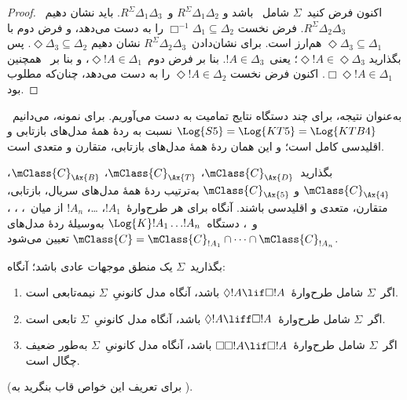 \documentclass[../../../include/open-logic-section]{subfiles}
\begin{document}
\begin{proof}
  اکنون فرض کنید~$\Sigma$ شامل~ باشد و
  $R^\Sigma \Delta_1\Delta_2$ و~$R^\Sigma \Delta_1\Delta_3$. باید
  نشان دهیم~$R^\Sigma \Delta_2\Delta_3$. فرض نخست
  $\Box^{-1}\Delta_1 \subseteq \Delta_2$ را به دست
  می‌دهد، و فرض دوم با
  $\Diamond\Delta_3 \subseteq \Delta_1$ هم‌ارز
  است.
  برای نشان‌دادن~$R^\Sigma \Delta_2\Delta_3$ نشان دهیم
  $\Diamond\Delta_3 \subseteq \Delta_2$. پس بگذارید
  $\Diamond!A \in \Diamond\Delta_3$؛ یعنی~$!A \in \Delta_3$. بنا بر
  فرض دوم~$\Diamond!A \in \Delta_1$، و بنا بر~ همچنین
  $\Box\Diamond!A \in \Delta_1$. اکنون فرض نخست
  $\Diamond!A \in \Delta_2$ را به دست می‌دهد، چنان‌که مطلوب بود.
  \end{proof}

به‌عنوان نتیجه، برای چند دستگاه نتایج تمامیت به دست می‌آوریم. برای
نمونه، می‌دانیم~$\Log{S5} = \Log{KT5} = \Log{KTB4}$ نسبت به ردهٔ همهٔ
مدل‌های بازتابی و اقلیدسی کامل است؛ و این همان ردهٔ همهٔ مدل‌های
بازتابی، متقارن و متعدی است.

\begin{thm}
  بگذارید~$\mClass{C}_\Ax{D}$، $\mClass{C}_\Ax{T}$،
  $\mClass{C}_\Ax{B}$، $\mClass{C}_\Ax{4}$ و
  $\mClass{C}_\Ax{5}$ به‌ترتیب ردهٔ همهٔ مدل‌های سریال، بازتابی،
  متقارن، متعدی و اقلیدسی باشند. آنگاه برای هر طرح‌وارهٔ~$!A_1$،
  \dots، $!A_n$ از میان~، ، ،  و~،
  دستگاه~$\Log{K}!A_1 \dots !A_n$ به‌وسیلهٔ ردهٔ مدل‌های
  $\mClass{C} = \mClass{C}_{!A_1} \cap \dots
  \cap \mClass{C}_{!A_n}$ تعیین می‌شود.
\end{thm}

\begin{prop}
  بگذارید~$\Sigma$ یک منطق موجهات عادی باشد؛ آنگاه:
  \begin{enumerate}
  \item{}%
    اگر~$\Sigma$ شامل طرح‌وارهٔ~$\Diamond!A \lif \Box
    !A$ باشد، آنگاه مدل کانونیِ~$\Sigma$ نیمه‌تابعی است.
  \item اگر~$\Sigma$ شامل طرح‌وارهٔ~$\Diamond!A \liff \Box
    !A$ باشد، آنگاه مدل کانونیِ~$\Sigma$ تابعی است.
  \item اگر~$\Sigma$ شامل طرح‌وارهٔ~$\Box\Box!A \lif \Box
    !A$ باشد، آنگاه مدل کانونیِ~$\Sigma$ به‌طور ضعیف چگال است.
  \end{enumerate}
(برای تعریف این خواص قاب بنگرید به
  ).
\end{prop}
\end{document}

